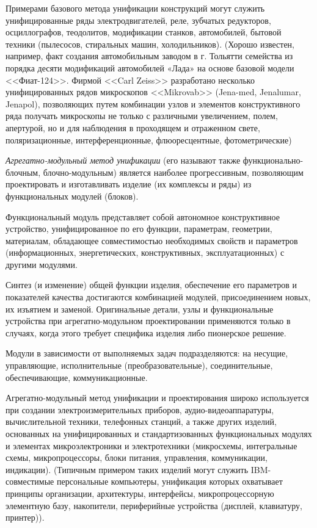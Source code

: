 \begin{enumerate}
Примерами базового метода унификации конструкций могут служить унифицированные ряды электродвигателей, реле, зубчатых редукторов, осциллографов, теодолитов, модификации станков, автомобилей, бытовой техники (пылесосов, стиральных машин, холодильников). (Хорошо известен, например, факт создания автомобильным заводом в г. Тольятти семейства из порядка десяти модификаций автомобилей «Лада» на основе базовой модели <<Фиат-124>>. Фирмой <<Carl Zeiss>> разработано несколько унифицированных рядов микроскопов <<Mikrovab>> (Jena-med, Jenalumar, Jenapol), позволяющих путем комбинации узлов и элементов конструктивного ряда получать микроскопы не только с различными увеличением, полем, апертурой, но и для наблюдения в проходящем и отраженном свете, поляризационные, интерференционные, флюоресцентные, фотометрические)

\textit{Агрегатно-модульный метод унификации} (его называют также функционально-блочным, блочно-модульным) является наиболее прогрессивным, позволяющим проектировать и изготавливать изделие (их комплексы и ряды) из функциональных модулей (блоков).

Функциональный модуль представляет собой автономное конструктивное устройство, унифицированное по его функции, параметрам, геометрии, материалам, обладающее совместимостью необходимых свойств и параметров (информационных, энергетических, конструктивных, эксплуатационных) с другими модулями.

Синтез (и изменение) общей функции изделия, обеспечение его параметров и показателей качества достигаются комбинацией модулей, присоединением новых, их изъятием и заменой. Оригинальные детали, узлы и функциональные устройства при агрегатно-модульном проектировании применяются только в случаях, когда этого требует специфика изделия либо пионерское решение.

Модули в зависимости от выполняемых задач подразделяются: на несущие, управляющие, исполнительные (преобразовательные), соединительные, обеспечивающие, коммуникационные.

Агрегатно-модульный метод унификации и проектирования широко используется при создании электроизмерительных приборов, аудио-видеоаппаратуры, вычислительной техники, телефонных станций, а также других изделий, основанных на унифицированных и стандартизованных функциональных модулях и элементах микроэлектроники и электротехники (микросхемы, интегральные схемы, микропроцессоры, блоки питания, управления, коммуникации, индикации). (Типичным примером таких изделий могут служить IBM-совместимые персональные компьютеры, унификация которых охватывает принципы организации, архитектуры, интерфейсы, микропроцессорную элементную базу, накопители, периферийные устройства (дисплей, клавиатуру, принтер)).


\end{enumerate}
